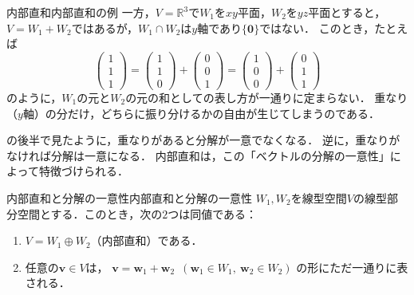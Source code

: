 \begin{example}{内部直和}{内部直和の例}
  一方，$V=\mathbb{R}^3$で$W_1$を$xy$平面，$W_2$を$yz$平面とすると，$V=W_1+W_2$ではあるが，$W_1\cap W_2$は$y$軸であり$\{\bm{0}\}$ではない．
  このとき，たとえば
  \[
    \begin{pmatrix} 1 \\ 1 \\ 1 \end{pmatrix}
    =\begin{pmatrix} 1 \\ 1 \\ 0 \end{pmatrix}+\begin{pmatrix} 0 \\ 0 \\ 1 \end{pmatrix}
    =\begin{pmatrix} 1 \\ 0 \\ 0 \end{pmatrix}+\begin{pmatrix} 0 \\ 1 \\ 1 \end{pmatrix}
  \]
  のように，$W_1$の元と$W_2$の元の和としての表し方が一通りに定まらない．
  重なり（$y$軸）の分だけ，どちらに振り分けるかの自由が生じてしまうのである．
\end{example}

の後半で見たように，重なりがあると分解が一意でなくなる．
逆に，重なりがなければ分解は一意になる．
内部直和は，この「ベクトルの分解の一意性」によって特徴づけられる．

\begin{prop}{内部直和と分解の一意性}{内部直和と分解の一意性}
  $W_1, W_2$を線型空間$V$の線型部分空間とする．このとき，次の$2$つは同値である：
  \begin{enumerate}[label=(\roman*),leftmargin=3.2em]
    \item $V = W_1 \oplus W_2$（内部直和）である．
    \item 任意の$\bm{v} \in V$は，
    $\bm{v} = \bm{w}_1 + \bm{w}_2$~$(\bm{w}_1 \in W_1,~ \bm{w}_2 \in W_2)$
    の形にただ一通りに表される．
  \end{enumerate}
\end{prop}


